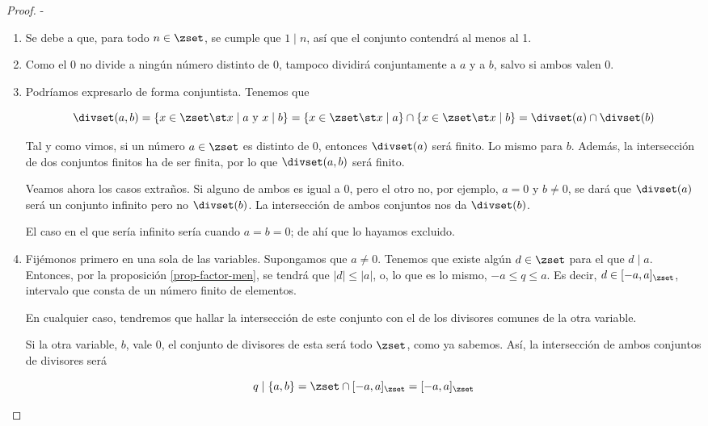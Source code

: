 \begin{proof}
  -
  \begin{enumerate}
    \item Se debe a que, para todo $n \in \zset$, se cumple que $1 \mid n$,
      así que el conjunto contendrá al menos al 1.

    \item Como el 0 no divide a ningún número distinto de 0, tampoco
      dividirá conjuntamente a $a$ y a $b$, salvo si ambos valen 0.

    \item Podríamos expresarlo de forma conjuntista. Tenemos que

      $$ \divset(a, b) = \{x \in \zset \st x \mid a \ \text{y} \ x \mid b\}
      = \{x \in \zset \st x \mid a\} \cap \{x \in \zset \st x \mid b\} =
      \divset(a) \cap \divset(b) $$

      Tal y como vimos, si un número $a \in \zset$ es distinto de 0,
      entonces $\divset(a)$ será finito. Lo mismo para $b$. Además, la
      intersección de dos conjuntos finitos ha de ser finita, por lo que
      $\divset(a, b)$ será finito.

      Veamos ahora los casos extraños. Si alguno de ambos es igual a 0, pero
      el otro no, por ejemplo, $a = 0$ y $b \neq 0$, se dará que
      $\divset(a)$ será un conjunto infinito pero no $\divset(b)$. La
      intersección de ambos conjuntos nos da $\divset(b)$.

      El caso en el que sería infinito sería cuando $a = b = 0$; de ahí que
      lo hayamos excluido.\qedhere

    \iffalse
    \item Fijémonos primero en una sola de las variables. Supongamos que $a
      \neq 0$. Tenemos que existe algún $d \in \zset$ para el que $d \mid
      a$. Entonces, por la proposición \ref{prop-factor-men}, se tendrá que
      $|d| \leq |a|$, o, lo que es lo mismo, ${-a} \leq q \leq a$. Es decir,
      $d \in [{-a}, a]_{\zset}$, intervalo que consta de un número finito de
      elementos.

      En cualquier caso, tendremos que hallar la intersección de este
      conjunto con el de los divisores comunes de la otra variable.

      Si la otra variable, $b$, vale 0, el conjunto de divisores de esta
      será todo $\zset$, como ya sabemos. Así, la intersección de ambos
      conjuntos de divisores será

      $$ q \mid \{a, b\} = \zset \cap [{-a}, a]_{\zset} = [{-a}, a]_{\zset}
      $$


\end{enumerate}
\end{proof}

